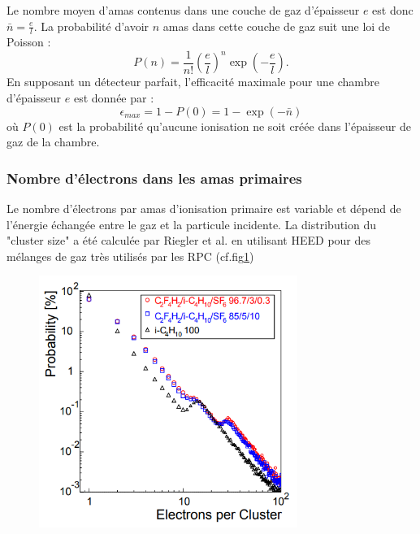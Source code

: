 Le nombre moyen d'amas contenus dans une couche de gaz d'épaisseur $e$ est donc $\bar{n}=\frac{e}{l}$. La probabilité d'avoir $n$ amas dans cette couche de gaz suit une loi de Poisson :
\begin{equation}
P(n)=\frac{1}{n!}\left(\frac{e}{l}\right)^{n}\exp\left(-\frac{e}{l}\right).
\end{equation}
En supposant un détecteur parfait, l'efficacité maximale pour une chambre d'épaisseur $e$ est donnée par :
\begin{equation}
\epsilon_{max}=1-P(0)=1-\exp\left(-\bar{n}\right)
\end{equation}
où $P(0)$ est la probabilité qu'aucune ionisation ne soit créée dans l'épaisseur de gaz de la chambre.

\subsubsection{Nombre d'électrons dans les amas primaires}
Le nombre d'électrons par amas d'ionisation primaire est variable et dépend de l'énergie échangée entre le gaz et la particule incidente. La distribution du "cluster size" a été calculée par Riegler et al. \cite{Riegler:570462} en utilisant HEED pour des mélanges de gaz très utilisés par les RPC (cf.fig\ref{cluster})
\begin{figure}[h!]
	\centering
	\includegraphics[width=0.75\textwidth]{RPC/cluster.png}
	\label{cluster}
\end{figure}

